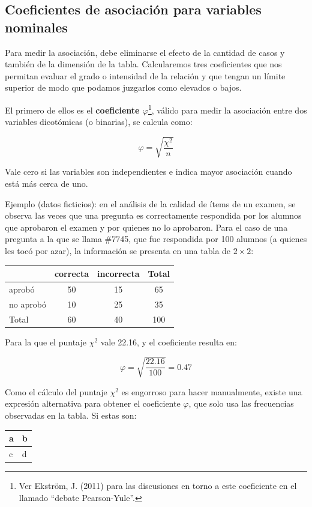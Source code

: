\documentclass[]{book}
\let\rmarkdownfootnote\footnote%
\def\footnote{\protect\rmarkdownfootnote}
\begin{document}
\hypertarget{coeficientes-de-asociaciuxf3n-para-variables-nominales}{%
\subsection{Coeficientes de asociación para variables nominales}\label{coeficientes-de-asociaciuxf3n-para-variables-nominales}}

Para medir la asociación, debe eliminarse el efecto de la cantidad de
casos y también de la dimensión de la tabla. Calcularemos tres
coeficientes que nos permitan evaluar el grado o intensidad de la
relación y que tengan un límite superior de modo que podamos juzgarlos como elevados o bajos.

El primero de ellos es el \textbf{coeficiente \(\varphi\)}\footnote{Ver Ekström, J. (2011) para las discusiones en torno a este coeficiente en el llamado ``debate Pearson-Yule''.}, válido para medir la asociación entre dos variables dicotómicas (o binarias), se calcula como:

\[\varphi = \sqrt{\frac{\chi^{2}}{n}}\]

Vale cero si las variables son independientes e indica mayor asociación cuando está más cerca de uno.

Ejemplo (datos ficticios): en el análisis de la calidad de ítems de un examen, se observa las veces que una pregunta es correctamente
respondida por los alumnos que aprobaron el examen y por quienes no lo aprobaron. Para el caso de una pregunta a la que se llama \#7745, que fue respondida por 100 alumnos (a quienes les tocó por azar), la
información se presenta en una tabla de \(2 \times 2\):

\begin{longtable}[]{@{}lccc@{}}
\toprule
& correcta & incorrecta & Total\tabularnewline
\midrule
\endhead
aprobó & 50 & 15 & 65\tabularnewline
no aprobó & 10 & 25 & 35\tabularnewline
Total & 60 & 40 & 100\tabularnewline
\bottomrule
\end{longtable}

Para la que el puntaje \(\chi^{2}\) vale 22.16, y el coeficiente resulta en:

\[\varphi = \sqrt{\frac{22.16}{100}} = 0.47\]

Como el cálculo del puntaje \(\chi^{2}\) es engorroso para hacer
manualmente, existe una expresión alternativa para obtener el coeficiente \(\varphi\), que solo usa las frecuencias observadas en la tabla. Si estas son:

\begin{longtable}[]{@{}ll@{}}
\toprule
a & b\tabularnewline
\midrule
\endhead
c & d\tabularnewline
\bottomrule
\end{longtable}
\end{document}

